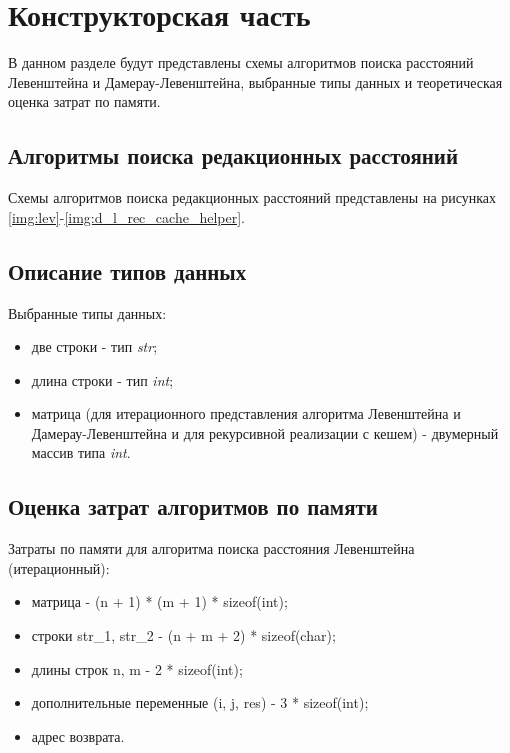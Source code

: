 \chapter{Конструкторская часть}
В данном разделе будут представлены схемы алгоритмов поиска расстояний Левенштейна и Дамерау-Левенштейна, выбранные типы данных и теоретическая оценка затрат по памяти.

\section{Алгоритмы поиска редакционных расстояний}
Схемы алгоритмов поиска редакционных расстояний представлены на рисунках \ref{img:lev}-\ref{img:d_l_rec_cache_helper}.
\clearpage


\section{Описание типов данных}
Выбранные типы данных:

\begin{itemize}
    \item две строки - тип \textit{str};
    \item длина строки - тип \textit{int};
    \item матрица (для итерационного представления алгоритма Левенштейна и Дамерау-Левенштейна и для рекурсивной реализации с кешем) - двумерный массив типа \textit{int}. 
\end{itemize}


\section{Оценка затрат алгоритмов по памяти}

Затраты по памяти для алгоритма поиска расстояния Левенштейна (итерационный):
\begin{itemize}
    \item матрица - (n + 1) * (m + 1) * sizeof(int);
    \item строки str\_1, str\_2 - (n + m + 2) * sizeof(char);
    \item длины строк n, m - 2 * sizeof(int);
    \item дополнительные переменные (i, j, res) - 3 * sizeof(int);
    \item адрес возврата.
\end{itemize}

